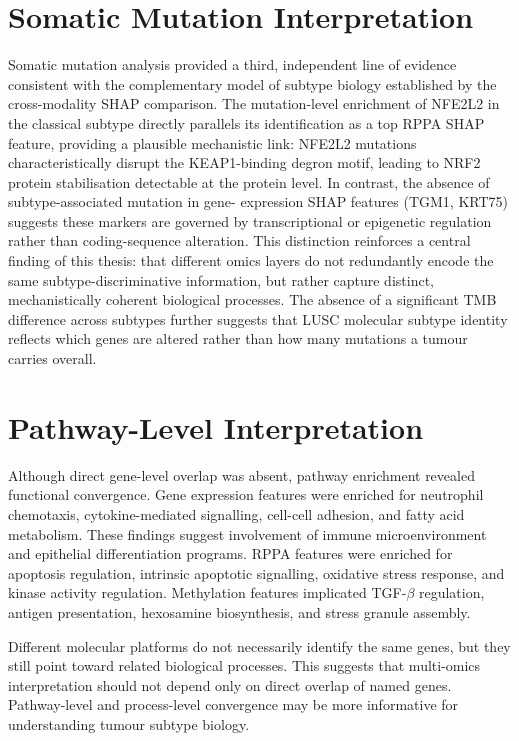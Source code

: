 \section{Somatic Mutation Interpretation}
Somatic mutation analysis provided a third, independent line of evidence consistent with the complementary model of subtype biology established by the cross-modality SHAP comparison. The mutation-level enrichment of NFE2L2 in the classical subtype directly parallels its identification as a top RPPA SHAP feature, providing a plausible mechanistic link: NFE2L2 mutations characteristically disrupt the KEAP1-binding degron motif, leading to NRF2 protein stabilisation detectable at the protein level. In contrast, the absence of subtype-associated mutation in gene- expression SHAP features (TGM1, KRT75) suggests these markers are governed by transcriptional or epigenetic regulation rather than coding-sequence alteration. This distinction reinforces a central finding of this thesis: that different omics layers do not redundantly encode the same subtype-discriminative information, but rather capture distinct, mechanistically coherent biological processes. The absence of a significant TMB difference across subtypes further suggests that LUSC molecular subtype identity reflects which genes are altered rather than how many mutations a tumour carries overall.

\section{Pathway-Level Interpretation}

Although direct gene-level overlap was absent, pathway enrichment revealed functional convergence. Gene expression features were enriched for neutrophil chemotaxis, cytokine-mediated signalling, cell-cell adhesion, and fatty acid metabolism. These findings suggest involvement of immune microenvironment and epithelial differentiation programs. RPPA features were enriched for apoptosis regulation, intrinsic apoptotic signalling, oxidative stress response, and kinase activity regulation. Methylation features implicated TGF-$\beta$ regulation, antigen presentation, hexosamine biosynthesis, and stress granule assembly.

Different molecular platforms do not necessarily identify the same genes, but they still point toward related biological processes. This suggests that multi-omics interpretation should not depend only on direct overlap of named genes. Pathway-level and process-level convergence may be more informative for understanding tumour subtype biology.

